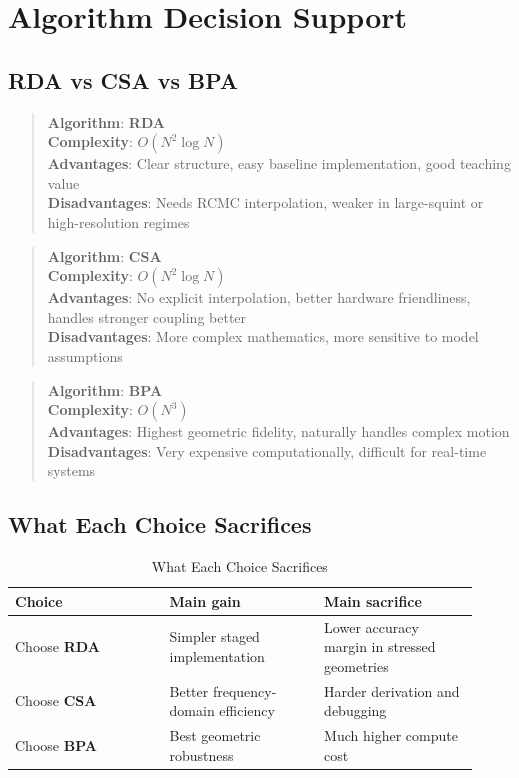 \documentclass[journal,onecolumn]{IEEEtran}
\begin{document}
\section{Algorithm Decision Support}
\subsection{RDA vs CSA vs BPA}
\begin{quote}
\textbf{Algorithm}: \textbf{RDA}\\
\textbf{Complexity}: $O(N^2 \log N)$\\
\textbf{Advantages}: Clear structure, easy baseline implementation, good teaching value\\
\textbf{Disadvantages}: Needs RCMC interpolation, weaker in large-squint or high-resolution regimes\\
\end{quote}
\begin{quote}
\textbf{Algorithm}: \textbf{CSA}\\
\textbf{Complexity}: $O(N^2 \log N)$\\
\textbf{Advantages}: No explicit interpolation, better hardware friendliness, handles stronger coupling better\\
\textbf{Disadvantages}: More complex mathematics, more sensitive to model assumptions\\
\end{quote}
\begin{quote}
\textbf{Algorithm}: \textbf{BPA}\\
\textbf{Complexity}: $O(N^3)$\\
\textbf{Advantages}: Highest geometric fidelity, naturally handles complex motion\\
\textbf{Disadvantages}: Very expensive computationally, difficult for real-time systems\\
\end{quote}
\subsection{What Each Choice Sacrifices}
\begin{table}[H]
\centering
\caption{What Each Choice Sacrifices}
\label{tab:what-each-choice-sacrifices}
\begin{tabular}{>{\raggedright\arraybackslash}p{0.307\linewidth}>{\raggedright\arraybackslash}p{0.307\linewidth}>{\raggedright\arraybackslash}p{0.307\linewidth}}
\toprule
Choice & Main gain & Main sacrifice \\
\midrule
Choose \textbf{RDA} & Simpler staged implementation & Lower accuracy margin in stressed geometries \\
Choose \textbf{CSA} & Better frequency-domain efficiency & Harder derivation and debugging \\
Choose \textbf{BPA} & Best geometric robustness & Much higher compute cost \\
\bottomrule
\end{tabular}
\end{table}
\end{document}
